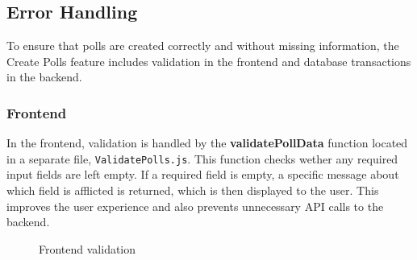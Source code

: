 \documentclass[a4paper,12pt]{report}
\begin{document}
\subsection{Error Handling}
To ensure that polls are created correctly and without missing information, the Create Polls feature includes validation in the frontend and database transactions in the backend.
\subsubsection{Frontend}
In the frontend, validation is handled by the \textbf{validatePollData} function located in a separate file, \texttt{ValidatePolls.js}. This function checks wether any required input fields are left empty. If a required field is empty, a specific message about which field is afflicted is returned, which is then displayed to the user. This improves the user experience and also prevents unnecessary API calls to the backend.
\begin{figure}[H]
	\caption{Frontend validation}
	\label{fig:validate-poll-data}
\end{figure}
\end{document}
